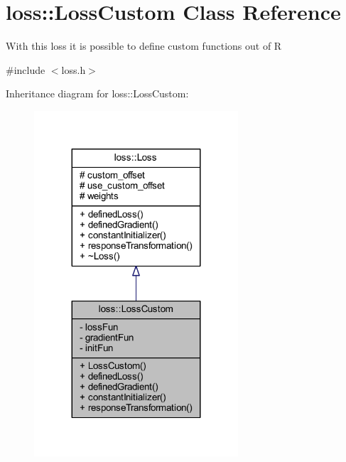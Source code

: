 \hypertarget{classloss_1_1_loss_custom}{}\section{loss\+:\+:Loss\+Custom Class Reference}
\label{classloss_1_1_loss_custom}


With this loss it is possible to define custom functions out of {\ttfamily R}  




{\ttfamily \#include $<$loss.\+h$>$}



Inheritance diagram for loss\+:\+:Loss\+Custom\+:\nopagebreak
\begin{figure}[H]
\begin{center}
\leavevmode
\includegraphics[width=215pt]{classloss_1_1_loss_custom__inherit__graph}
\end{center}
\end{figure}


